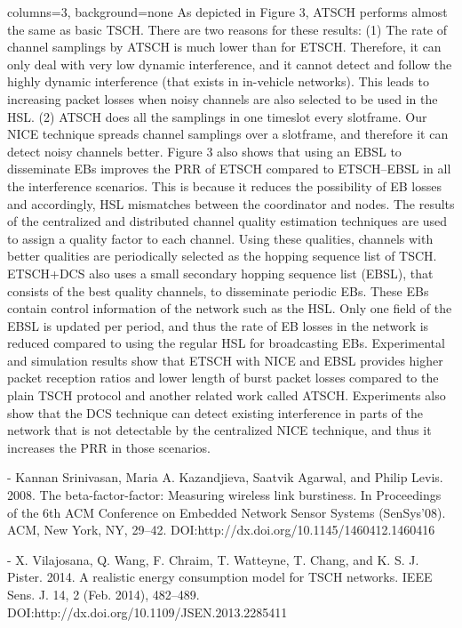 \documentclass[portrait,paperwidth=91cm,paperheight=121cm,fontscale=0.35]{baposter} %
\begin{document}
\begin{poster}{columns=3, background=none}
{As depicted in Figure 3, ATSCH performs almost the same as basic
TSCH. There are two reasons for these results: (1) The rate of channel samplings by ATSCH is
much lower than for ETSCH. Therefore, it can only deal with very low dynamic interference, and
it cannot detect and follow the highly dynamic interference (that exists in in-vehicle networks).
This leads to increasing packet losses when noisy channels are also selected to be used in the HSL.
(2) ATSCH does all the samplings in one timeslot every slotframe. Our NICE technique spreads
channel samplings over a slotframe, and therefore it can detect noisy channels better.
Figure 3 also shows that using an EBSL to disseminate EBs improves the PRR of ETSCH compared
to ETSCH–EBSL in all the interference scenarios. This is because it reduces the possibility
of EB losses and accordingly, HSL mismatches between the coordinator and nodes. 
}
{The results of the centralized and distributed channel quality estimation
techniques are used to assign a quality factor to each channel. Using these qualities, channels with
better qualities are periodically selected as the hopping sequence list of TSCH. ETSCH+DCS also
uses a small secondary hopping sequence list (EBSL), that consists of the best quality channels, to
disseminate periodic EBs. These EBs contain control information of the network such as the HSL.
Only one field of the EBSL is updated per period, and thus the rate of EB losses in the network
is reduced compared to using the regular HSL for broadcasting EBs. Experimental and simulation
results show that ETSCH with NICE and EBSL provides higher packet reception ratios and lower
length of burst packet losses compared to the plain TSCH protocol and another related work called
ATSCH. Experiments also show that the DCS technique can detect existing interference in parts
of the network that is not detectable by the centralized NICE technique, and thus it increases the
PRR in those scenarios.}

{
- Kannan Srinivasan, Maria A. Kazandjieva, Saatvik Agarwal, and Philip Levis. 2008. The beta-factor-factor: Measuring
wireless link burstiness. In Proceedings of the 6th ACM Conference on Embedded Network Sensor Systems (SenSys’08).
ACM, New York, NY, 29–42. DOI:http://dx.doi.org/10.1145/1460412.1460416

- X. Vilajosana, Q. Wang, F. Chraim, T. Watteyne, T. Chang, and K. S. J. Pister. 2014. A realistic energy consumption
model for TSCH networks. IEEE Sens. J. 14, 2 (Feb. 2014), 482–489. DOI:http://dx.doi.org/10.1109/JSEN.2013.2285411




}
\end{poster}
\end{document}
